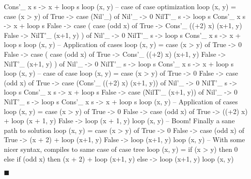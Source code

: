 \begin{spec}
                Cons'_ x s -> x + loop s
loop (x, y)
-- case of case optimization
loop (x, y) = case (x > y) of
                True -> case (Nil'_) of
                  Nil'_ -> 0
                  NilT'_ s -> loop s
                  Cons'_ x s -> x + loop s
                False -> case (
                  case (odd x) of
                    True -> Cons'_ ((+2) x) (x+1, y)
                    False -> NilT'_ (x+1, y)
                ) of
                  Nil'_ -> 0
                  NilT'_ s -> loop s
                  Cons'_ x s -> x + loop s
loop (x, y)
-- Application of cases
loop (x, y) = case (x > y) of
                True -> 0
                False -> case (
                  case (odd x) of
                    True -> Cons'_ ((+2) x) (x+1, y)
                    False -> NilT'_ (x+1, y)
                ) of
                  Nil'_ -> 0
                  NilT'_ s -> loop s
                  Cons'_ x s -> x + loop s
loop (x, y)
-- case of case
loop (x, y) = case (x > y) of
                True -> 0
                False -> case (odd x) of
                  True -> case (Cons'_ ((+2) x) (x+1, y)) of
                    Nil'_ -> 0
                    NilT'_ s -> loop s
                    Cons'_ x s -> x + loop s
                  False -> case (NilT'_ (x+1, y)) of
                    Nil'_ -> 0
                    NilT'_ s -> loop s
                    Cons'_ x s -> x + loop s
loop (x, y)
-- Application of cases
loop (x, y) = case (x > y) of
                True -> 0
                False -> case (odd x) of
                  True -> ((+2) x) + loop (x + 1, y)
                  False -> loop (x + 1, y)
loop (x, y)
-- Boom! Finally a sane path to solution
loop (x, y) = case (x > y) of
                True -> 0
                False -> case (odd x) of
                  True -> (x + 2) + loop (x+1, y)
                  False -> loop (x+1, y)
loop (x, y)
-- With some nicer syntax, compiles to same case of case tree
loop (x, y) = if (x > y)
              then 0
              else if (odd x)
                   then (x + 2) + loop (x+1, y)
                   else -> loop (x+1, y)
loop (x, y)
\end{spec}
$\blacksquare$